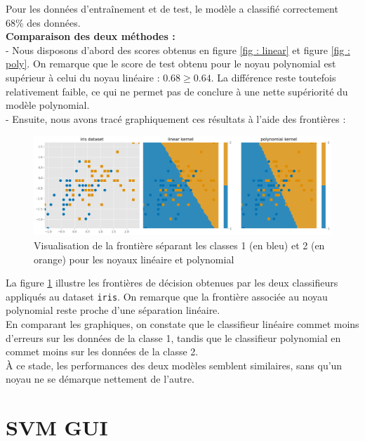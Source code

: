 \documentclass[a4paper,12pt]{article}
\begin{document}
Pour les données d'entraînement et de test, le modèle a classifié correctement 68\% des données. \\

\textbf{Comparaison des deux méthodes  : }\\[0.5cm]
- Nous disposons d'abord des scores obtenus en figure \ref{fig : linear} et figure \ref{fig : poly}.
On remarque que le score de test obtenu pour le noyau polynomial est supérieur à celui du noyau linéaire : $0.68 \geq 0.64$.
La différence reste toutefois relativement faible, ce qui ne permet pas de conclure à une nette supériorité du modèle polynomial.\\

- Ensuite, nous avons tracé graphiquement ces résultats à l'aide des frontières : \\
\begin{figure}[H]
    \centering
    \includegraphics[width=\textwidth]{Images/linear_vs_poly.png}
    \caption{Visualisation de la frontière séparant les classes 1 (en bleu) et 2 (en orange) pour les noyaux linéaire et polynomial}\label{fig : compare}
\end{figure}

La figure \ref{fig : compare} illustre les frontières de décision obtenues par les deux classifieurs appliqués au dataset \texttt{iris}.  
On remarque que la frontière associée au noyau polynomial reste proche d’une séparation linéaire. \\
En comparant les graphiques, on constate que le classifieur linéaire commet moins d’erreurs sur les données de la classe 1, tandis que le classifieur polynomial en commet moins sur les données de la classe 2.  \\
À ce stade, les performances des deux modèles semblent similaires, sans qu’un noyau ne se démarque nettement de l’autre.

\newpage

\section{SVM GUI}
\end{document}
